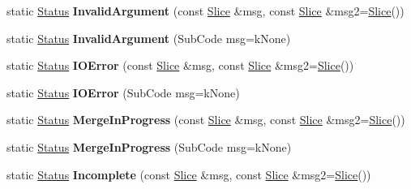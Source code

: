 \begin{DoxyCompactItemize}
\item 
static \hyperlink{classrocksdb_1_1Status}{Status} {\bfseries Invalid\+Argument} (const \hyperlink{classrocksdb_1_1Slice}{Slice} \&msg, const \hyperlink{classrocksdb_1_1Slice}{Slice} \&msg2=\hyperlink{classrocksdb_1_1Slice}{Slice}())\hypertarget{classrocksdb_1_1Status_a5afec51a3f306b6f188a5af0c5d003ba}{}\label{classrocksdb_1_1Status_a5afec51a3f306b6f188a5af0c5d003ba}

\item 
static \hyperlink{classrocksdb_1_1Status}{Status} {\bfseries Invalid\+Argument} (Sub\+Code msg=k\+None)\hypertarget{classrocksdb_1_1Status_ad83a72735d10c30cb97337412256a3e6}{}\label{classrocksdb_1_1Status_ad83a72735d10c30cb97337412256a3e6}

\item 
static \hyperlink{classrocksdb_1_1Status}{Status} {\bfseries I\+O\+Error} (const \hyperlink{classrocksdb_1_1Slice}{Slice} \&msg, const \hyperlink{classrocksdb_1_1Slice}{Slice} \&msg2=\hyperlink{classrocksdb_1_1Slice}{Slice}())\hypertarget{classrocksdb_1_1Status_aebdc2d6b55f9d3145ea7add1551be0bc}{}\label{classrocksdb_1_1Status_aebdc2d6b55f9d3145ea7add1551be0bc}

\item 
static \hyperlink{classrocksdb_1_1Status}{Status} {\bfseries I\+O\+Error} (Sub\+Code msg=k\+None)\hypertarget{classrocksdb_1_1Status_a63110d6c30793cd74ff23140808072ba}{}\label{classrocksdb_1_1Status_a63110d6c30793cd74ff23140808072ba}

\item 
static \hyperlink{classrocksdb_1_1Status}{Status} {\bfseries Merge\+In\+Progress} (const \hyperlink{classrocksdb_1_1Slice}{Slice} \&msg, const \hyperlink{classrocksdb_1_1Slice}{Slice} \&msg2=\hyperlink{classrocksdb_1_1Slice}{Slice}())\hypertarget{classrocksdb_1_1Status_ae68d506384bf32b72c7db619eaeb508a}{}\label{classrocksdb_1_1Status_ae68d506384bf32b72c7db619eaeb508a}

\item 
static \hyperlink{classrocksdb_1_1Status}{Status} {\bfseries Merge\+In\+Progress} (Sub\+Code msg=k\+None)\hypertarget{classrocksdb_1_1Status_a05a1e4898e057666ac98a005d62857e3}{}\label{classrocksdb_1_1Status_a05a1e4898e057666ac98a005d62857e3}

\item 
static \hyperlink{classrocksdb_1_1Status}{Status} {\bfseries Incomplete} (const \hyperlink{classrocksdb_1_1Slice}{Slice} \&msg, const \hyperlink{classrocksdb_1_1Slice}{Slice} \&msg2=\hyperlink{classrocksdb_1_1Slice}{Slice}())\hypertarget{classrocksdb_1_1Status_a223ccba0dce26cd4539d6fd2c28ae364}{}\label{classrocksdb_1_1Status_a223ccba0dce26cd4539d6fd2c28ae364}


\end{DoxyCompactItemize}
